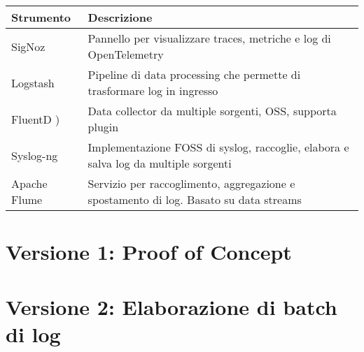 \documentclass[12pt]{report}
\begin{document}
\begin{tabular}{|p{}|p{}|}
    \hline
    \textbf{Strumento} & \textbf{Descrizione}                                                                  \\ \hline
    SigNoz             & Pannello per visualizzare traces, metriche e log di OpenTelemetry                     \\ \hline
    Logstash           & Pipeline di data processing che permette di trasformare log in ingresso               \\ \hline
    FluentD )          & Data collector da multiple sorgenti, OSS, supporta plugin                             \\ \hline
    Syslog-ng          & Implementazione FOSS di syslog, raccoglie, elabora e salva log da multiple sorgenti   \\ \hline
    Apache Flume       & Servizio per raccoglimento, aggregazione e spostamento di log. Basato su data streams \\ \hline
\end{tabular}



\clearpage



%
%

\appendix


\section{Versione 1: Proof of Concept}






\clearpage

\section{Versione 2: Elaborazione di batch di log}
\end{document}
